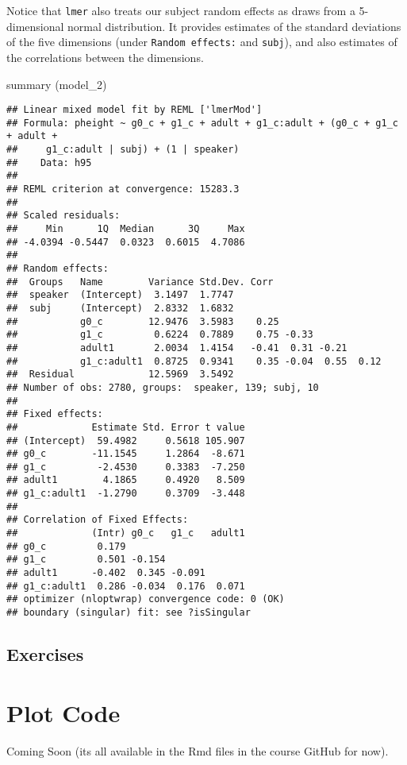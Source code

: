\documentclass[
]{book}
\newenvironment{Shaded}{\begin{snugshade}}{\end{snugshade}}
\newcommand{\FunctionTok}[1]{\textcolor[rgb]{0.00,0.00,0.00}{#1}}
\newcommand{\NormalTok}[1]{#1}
\begin{document}
Notice that \texttt{lmer} also treats our subject random effects as draws from a 5-dimensional normal distribution. It provides estimates of the standard deviations of the five dimensions (under \texttt{Random\ effects:} and \texttt{subj}), and also estimates of the correlations between the dimensions.

\begin{Shaded}
\begin{Highlighting}[]
\FunctionTok{summary}\NormalTok{ (model\_2)}
\end{Highlighting}
\end{Shaded}

\begin{verbatim}
## Linear mixed model fit by REML ['lmerMod']
## Formula: pheight ~ g0_c + g1_c + adult + g1_c:adult + (g0_c + g1_c + adult +  
##     g1_c:adult | subj) + (1 | speaker)
##    Data: h95
## 
## REML criterion at convergence: 15283.3
## 
## Scaled residuals: 
##     Min      1Q  Median      3Q     Max 
## -4.0394 -0.5447  0.0323  0.6015  4.7086 
## 
## Random effects:
##  Groups   Name        Variance Std.Dev. Corr                   
##  speaker  (Intercept)  3.1497  1.7747                          
##  subj     (Intercept)  2.8332  1.6832                          
##           g0_c        12.9476  3.5983    0.25                  
##           g1_c         0.6224  0.7889    0.75 -0.33            
##           adult1       2.0034  1.4154   -0.41  0.31 -0.21      
##           g1_c:adult1  0.8725  0.9341    0.35 -0.04  0.55  0.12
##  Residual             12.5969  3.5492                          
## Number of obs: 2780, groups:  speaker, 139; subj, 10
## 
## Fixed effects:
##             Estimate Std. Error t value
## (Intercept)  59.4982     0.5618 105.907
## g0_c        -11.1545     1.2864  -8.671
## g1_c         -2.4530     0.3383  -7.250
## adult1        4.1865     0.4920   8.509
## g1_c:adult1  -1.2790     0.3709  -3.448
## 
## Correlation of Fixed Effects:
##             (Intr) g0_c   g1_c   adult1
## g0_c         0.179                     
## g1_c         0.501 -0.154              
## adult1      -0.402  0.345 -0.091       
## g1_c:adult1  0.286 -0.034  0.176  0.071
## optimizer (nloptwrap) convergence code: 0 (OK)
## boundary (singular) fit: see ?isSingular
\end{verbatim}

\hypertarget{exercises-5}{%
\section{Exercises}\label{exercises-5}}

\hypertarget{plot-code}{%
\chapter{Plot Code}\label{plot-code}}

Coming Soon (its all available in the Rmd files in the course GitHub for now).
\end{document}
